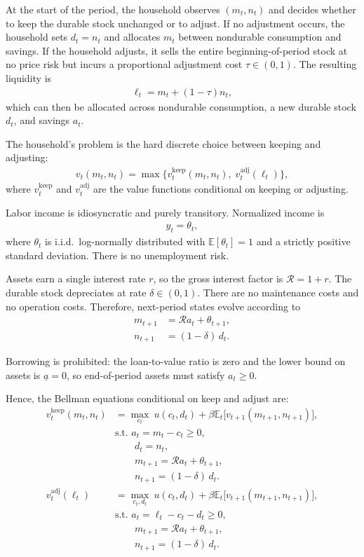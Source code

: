 At the start of the period, the household observes $(m_t, n_t)$ and decides whether to keep the durable stock unchanged or to adjust. If no adjustment occurs, the household sets $d_t = n_t$ and allocates $m_t$ between nondurable consumption and savings. If the household adjusts, it sells the entire beginning-of-period stock at no price risk but incurs a proportional adjustment cost $\tau \in (0,1)$. The resulting liquidity is
\begin{align}
	\ell_t = m_t + (1-\tau)n_t,
\end{align}
which can then be allocated across nondurable consumption, a new durable stock $d_t$, and savings $a_t$.

The household's problem is the hard discrete choice between keeping and adjusting:
\begin{align}
	v_t(m_t,n_t) = \max\Big\{ v_t^{\text{keep}}(m_t,n_t),\; v_t^{\text{adj}}(\ell_t)\Big\},
\end{align}
where $v_t^{\text{keep}}$ and $v_t^{\text{adj}}$ are the value functions conditional on keeping or adjusting.

Labor income is idiosyncratic and purely transitory. Normalized income is
\begin{align}
	y_t = \theta_t,
\end{align}
where $\theta_t$ is i.i.d.\ log-normally distributed with $\mathbb{E}[\theta_t] = 1$ and a strictly positive standard deviation. There is no unemployment risk.

Assets earn a single interest rate $r$, so the gross interest factor is $\mathcal{R} = 1+r$. The durable stock depreciates at rate $\delta \in (0,1)$. There are no maintenance costs and no operation costs. Therefore, next-period states evolve according to
\begin{align}
	m_{t+1} &= \mathcal{R} a_t + \theta_{t+1},\\
	n_{t+1} &= (1-\delta)\, d_t.
\end{align}

Borrowing is prohibited: the loan-to-value ratio is zero and the lower bound on assets is $\underline{a}=0$, so end-of-period assets must satisfy $a_t \ge 0$.

Hence, the Bellman equations conditional on keep and adjust are:
\begin{align}
	v_t^{\text{keep}}(m_t,n_t) &= \max_{c_t} \ u(c_t ,d_t) + \beta \mathbb{E}_t \big[ v_{t+1}(m_{t+1},n_{t+1}) \big],\\
	& \text{s.t. } a_t = m_t - c_t \geq 0,\\
	& \qquad d_t = n_t,\\
	& \qquad m_{t+1} = \mathcal{R} a_t + \theta_{t+1},\\
	& \qquad n_{t+1} = (1-\delta)\, d_t.\\[1em]
	v_t^{\text{adj}}(\ell_t) &= \max_{c_t,d_t} \ u(c_t,d_t) + \beta \mathbb{E}_t \big[ v_{t+1}(m_{t+1},n_{t+1}) \big],\\
	& \text{s.t. } a_t = \ell_t - c_t - d_t \geq 0,\\
	& \qquad m_{t+1} = \mathcal{R} a_t + \theta_{t+1},\\
	& \qquad n_{t+1} = (1-\delta)\, d_t.
\end{align}

